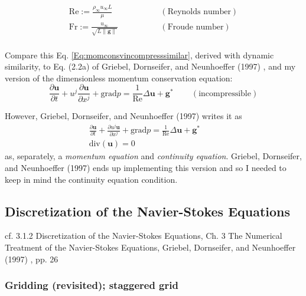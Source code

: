 \documentclass[10pt]{amsart}
\begin{document}
\begin{multicols*}{2}
\begin{equation}
\begin{aligned}
  \text{Re} := \frac{ \rho_{\infty} u_{\infty} L}{ \mu}  \qquad \, & \qquad \, (\text{Reynolds number}) \\
  \text{Fr} := \frac{  u_{\infty} }{ \sqrt{ L \| \mathbf{g} \| } }  \qquad \, & \qquad \, (\text{Froude number}) \\
  \end{aligned}
  \end{equation}

Compare this Eq. \ref{Eq:momconsvincompresssimilar}, derived with dynamic similarity, to Eq. (2.2a) of Griebel, Dornseifer, and Neunhoeffer (1997) \cite{GDN1997}, and my version of the dimensionless momentum conservation equation: 
\begin{equation}
  \frac{ \partial \mathbf{u}}{\partial t} + u^j \frac{ \partial \mathbf{u} }{ \partial x^j} + \text{grad} p = \frac{1}{\text{Re}} \Delta \mathbf{u} + \mathbf{g}^*  \qquad \, (\text{incompressible})
  \end{equation}

However, Griebel, Dornseifer, and Neunhoeffer (1997) \cite{GDN1997} writes it as
\begin{equation}
  \begin{gathered}
  \frac{ \partial \mathbf{u}}{\partial t} + \frac{ \partial u^j\mathbf{u} }{ \partial x^j} + \text{grad} p = \frac{1}{\text{Re}} \Delta \mathbf{u} + \mathbf{g}^*  \qquad \,  \\
\text{div}(\mathbf{u}) = 0 
    \end{gathered}
\end{equation}
as, separately, a \emph{momentum equation} and \emph{continuity equation}.  Griebel, Dornseifer, and Neunhoeffer (1997) \cite{GDN1997} ends up implementing this version and so I needed to keep in mind the continuity equation condition.  

\subsection{Discretization of the Navier-Stokes Equations}

cf. 3.1.2 Discretization of the Navier-Stokes Equations, Ch. 3 The Numerical Treatment of the Navier-Stokes Equations, Griebel, Dornseifer, and Neunhoeffer (1997) \cite{GDN1997}, pp. 26

\subsubsection{Gridding (revisited); staggered grid}


\end{multicols*}
\end{document}
